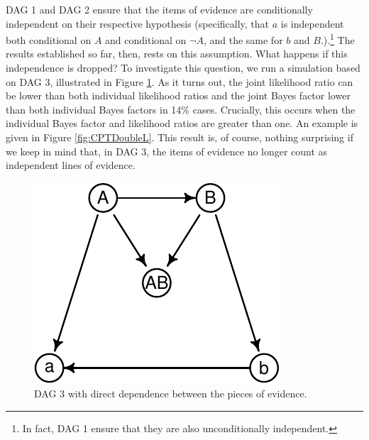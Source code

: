 \documentclass[
  10pt,
  dvipsnames,enabledeprecatedfontcommands]{scrartcl}
\newcommand{\n}{\neg}
\begin{document}
\textsf{DAG 1} and \textsf{DAG 2} ensure that the items of evidence are
conditionally independent on their respective hypothesis (specifically,
that \(a\) is independent both conditional on \(A\) and conditional on
\(\n A\), and the same for \(b\) and \(B\).).\footnote{In fact,
  \textsf{DAG 1} ensure that they are also unconditionally independent.}
The results established so far, then, rests on this assumption. What
happens if this independence is dropped? To investigate this question,
we run a simulation based on \textsf{DAG 3}, illustrated in Figure
\ref{fig:dag3}. As it turns out, the joint likelihood ratio can be lower
than both individual likelihood ratios and the joint Bayes factor lower
than both individual Bayes factors in 14\% cases. Crucially, this occurs
when the individual Bayes factor and likelihood ratios are greater than
one. An example is given in Figure \ref{fig:CPTDoubleL}. This result is,
of course, nothing surprising if we keep in mind that, in
\textsf{DAG 3}, the items of evidence no longer count as independent
lines of evidence.

\vspace{1mm}
\footnotesize

\normalsize

\begin{figure}[H]


\begin{center}\includegraphics[width=0.7\linewidth]{conjunction-appendix14_files/figure-latex/unnamed-chunk-27-1} \end{center}
\caption{\textsf{DAG 3} with direct dependence between the pieces of evidence.}
\label{fig:dag3}
\end{figure}
\end{document}
